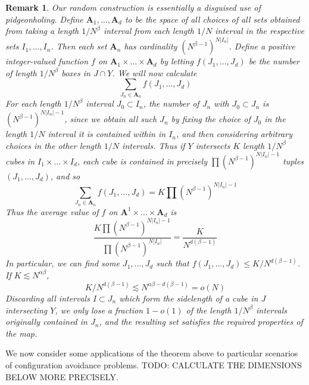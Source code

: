 \documentclass{report}
\theoremstyle{plain}
\theoremstyle{plain}
\newtheorem*{remark}{Remark}
\begin{document}
\begin{remark}
    Our random construction is essentially a disguised use of pidgeonholing. Define $\mathbf{A}_1, \dots, \mathbf{A}_d$ to be the space of all choices of all sets obtained from taking a length $1/N^\beta$ interval from each length $1/N$ interval in the respective sets $I_1, \dots, I_n$. Then each set $\mathbf{A}_n$ has cardinality $(N^{\beta - 1})^{N|I_n|}$. Define a positive integer-valued function $f$ on $\mathbf{A}_1 \times \dots \times \mathbf{A}_d$ by letting $f(J_1, \dots, J_d)$ be the number of length $1/N^\beta$ boxes in $J \cap Y$. We will now calculate
    \[ \sum_{J_n \in \mathbf{A}_n} f(J_1, \dots, J_d) \]
    For each length $1/N^\beta$ interval $J_0 \subset I_n$, the number of $J_n$ with $J_0 \subset J_n$ is $(N^{\beta-1})^{N|I_n| - 1}$, since we obtain all such $J_n$ by fixing the choice of $J_0$ in the length $1/N$ interval it is contained within in $I_n$, and then considering arbitrary choices in the other length $1/N$ intervals. Thus if $Y$ intersects $K$ length $1/N^\beta$ cubes in $I_1 \times \dots \times I_d$, each cube is contained in precisely $\prod (N^{\beta-1})^{N|I_n| - 1}$ tuples $(J_1, \dots, J_d)$, and so
    \[ \sum_{J_n \in \mathbf{A}_n} f(J_1, \dots, J_d) = K \prod (N^{\beta-1})^{N|I_n| - 1} \]
    Thus the average value of $f$ on $\mathbf{A}^1 \times \dots \times \mathbf{A}_d$ is
    \[ \frac{K \prod (N^{\beta - 1})^{N |I_n| - 1}}{\prod (N^{\beta-1})^{N |I_n|}} = \frac{K}{N^{d(\beta - 1)}} \]
    In particular, we can find some $J_1, \dots, J_d$ such that $f(J_1, \dots, J_d) \leq K/N^{d(\beta - 1)}$. If $K \lesssim N^{\alpha \beta}$,
    \[ K/N^{d(\beta - 1)} \lesssim N^{\alpha \beta - d(\beta - 1)} = o(N) \]
    Discarding all intervals $I \subset J_n$ which form the sidelength of a cube in $J$ intersecting $Y$, we only lose a fraction $1 - o(1)$ of the length $1/N^\beta$ intervals originally contained in $J_n$, and the resulting set satisfies the required properties of the map.
\end{remark}

We now consider some applications of the theorem above to particular scenarios of configuration avoidance problems. TODO: CALCULATE THE DIMENSIONS BELOW MORE PRECISELY.
\end{document}
